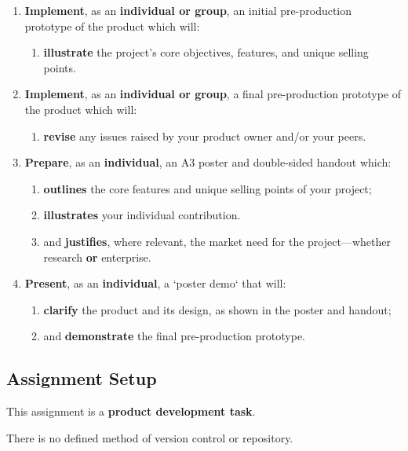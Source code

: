 \documentclass{../../fal_assignment}
\begin{document}
\begin{enumerate}[label=(\Alph*)]
    \item \textbf{Implement}, as an \textbf{individual or group}, an initial pre-production prototype of the product which will:
    	\begin{enumerate}[label=\roman*.]
    		\item \textbf{illustrate} the project's core objectives, features, and unique selling points.
	\end{enumerate}
    \item \textbf{Implement}, as an \textbf{individual or group}, a final pre-production prototype of the product which will:
    	\begin{enumerate}[label=\roman*.]
    		\item \textbf{revise} any issues raised by your product owner and/or your peers.
	\end{enumerate}
    \item \textbf{Prepare}, as an \textbf{individual}, an A3 poster and double-sided handout which:
    	\begin{enumerate}[label=\roman*.]
    		\item \textbf{outlines} the core features and unique selling points of your project;
		\item \textbf{illustrates} your individual contribution.
    		\item and \textbf{justifies}, where relevant, the market need for the project---whether research \textbf{or} enterprise.
	\end{enumerate}
    \item \textbf{Present}, as an \textbf{individual}, a `poster demo` that will:
    	\begin{enumerate}[label=\roman*.]
    		\item \textbf{clarify} the product and its design, as shown in the poster and handout;
    		\item and \textbf{demonstrate} the final pre-production prototype.
	\end{enumerate}
\end{enumerate}

\subsection*{Assignment Setup}

This assignment is a \textbf{product development task}.

There is no defined method of version control or repository.
\end{document}
